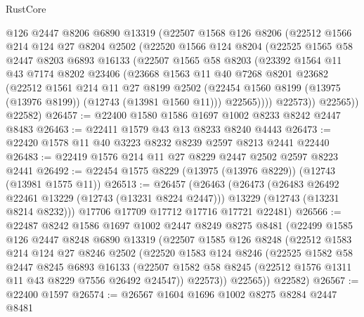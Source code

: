 \begin{lexlean}{RustCore}
\begin{coremodule}
      @126
      @2447
      @8206
      @6890
      @13319
      (@22507
        @1568
        @126
        @8206
        (@22512
          @1566
          @214
          @124
          @27
          @8204
          @2502
          (@22520
            @1566
            @124
            @8204
            (@22525
              @1565
              @58
              @2447
              @8203
              @6893
              @16133
              (@22507
                @1565
                @58
                @8203
                (@23392
                  @1564
                  @11
                  @43
                  @7174
                  @8202
                  @23406
                  (@23668
                    @1563
                    @11
                    @40
                    @7268
                    @8201
                    @23682
                    (@22512
                      @1561
                      @214
                      @11
                      @27
                      @8199
                      @2502
                      (@22454 @1560 @8199 (@13975 (@13976 @8199)) (@12743 (@13981 @1560 @11)))
                      @22565))))
              @22573))
          @22565))
      @22582)
@26457 := @22400 @1580 @1586 @1697 @1002 @8233 @8242 @2447 @8483
@26463 := @22411 @1579 @43 @13 @8233 @8240 @4443
@26473 := @22420 @1578 @11 @40 @3223 @8232 @8239 @2597 @8213 @2441 @22440
@26483 := @22419 @1576 @214 @11 @27 @8229 @2447 @2502 @2597 @8223 @2441
@26492 := @22454 @1575 @8229 (@13975 (@13976 @8229)) (@12743 (@13981 @1575 @11))
@26513 := @26457
    (@26463
      (@26473
        (@26483 @26492 @22461 @13229 (@12743 (@13231 @8224 @2447)))
        @13229
        (@12743 (@13231 @8214 @8232)))
      @17706
      @17709
      @17712
      @17716
      @17721
      @22481)
@26566 := @22487
    @8242
    @1586
    @1697
    @1002
    @2447
    @8249
    @8275
    @8481
    (@22499
      @1585
      @126
      @2447
      @8248
      @6890
      @13319
      (@22507
        @1585
        @126
        @8248
        (@22512
          @1583
          @214
          @124
          @27
          @8246
          @2502
          (@22520
            @1583
            @124
            @8246
            (@22525
              @1582
              @58
              @2447
              @8245
              @6893
              @16133
              (@22507 @1582 @58 @8245 (@22512 @1576 @1311 @11 @43 @8229 @7556 @26492 @24547))
              @22573))
          @22565))
      @22582)
@26567 := @22400 @1597
@26574 := @26567 @1604 @1696 @1002 @8275 @8284 @2447 @8481

\end{coremodule}
\end{lexlean}
